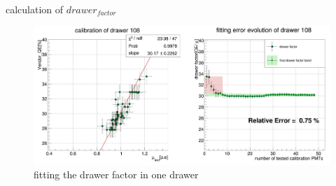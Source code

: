 \begin{frame}{calculation of $drawer_{factor}$}
\begin{figure}
\centering
\includegraphics[width=\textwidth]{figures/mucal.JPG} %
\caption{fitting the drawer factor in one drawer}
\end{figure}
\end{frame}
